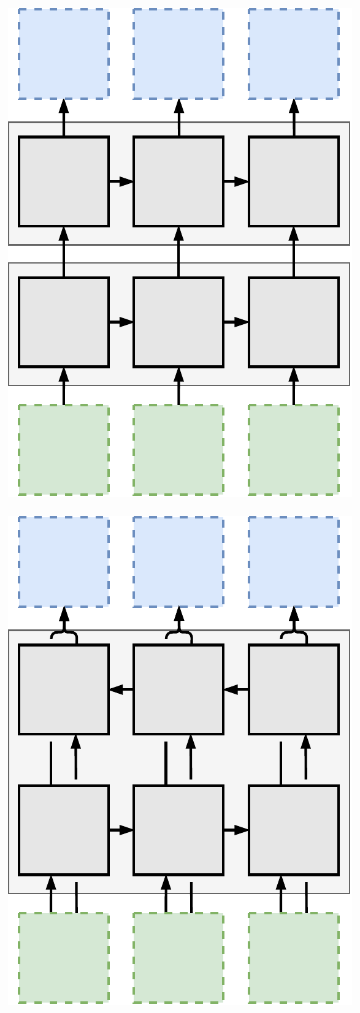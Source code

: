 \begin{figure}[htpb]
\centering
\begin{subfigure}{0.3\textwidth}
  \centering
  \includegraphics[width=.8\linewidth]{figures/rnn-multilayer.pdf}
  \caption{}
  \label{fig:rnn-multilayer}
\end{subfigure}%
\begin{subfigure}{0.3\textwidth}
  \centering
  \includegraphics[width=.8\linewidth]{figures/rnn-bidirectional.pdf}

\end{subfigure}
\end{figure}
